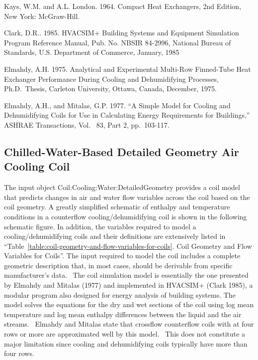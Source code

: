 Kays, W.M. and A.L. London. 1964. Compact Heat Exchangers, 2nd Edition, New York: McGraw-Hill.

Clark, D.R.. 1985. HVACSIM+ Building Systems and Equipment Simulation Program Reference Manual, Pub. No. NBSIR 84-2996, National Bureau of Standards, U.S. Department of Commerce, January, 1985

Elmahdy, A.H. 1975. Analytical and Experimental Multi-Row Finned-Tube Heat Exchanger Performance During Cooling and Dehumidifying Processes, Ph.D.~Thesis, Carleton University, Ottawa, Canada, December, 1975.

Elmahdy, A.H., and Mitalas, G.P. 1977. ``A Simple Model for Cooling and Dehumidifying Coils for Use in Calculating Energy Requirements for Buildings,'' ASHRAE Transactions, Vol.~ 83, Part 2, pp.~103-117.

\subsection{Chilled-Water-Based Detailed Geometry Air Cooling Coil}\label{chilled-water-based-detailed-geometry-air-cooling-coil}

The input object Coil:Cooling:Water:DetailedGeometry provides a coil model that predicts changes in air and water flow variables across the coil based on the coil geometry. A greatly simplified schematic of enthalpy and temperature conditions in a counterflow cooling/dehumidifying coil is shown in the following schematic figure. In addition, the variables required to model a cooling/dehumidifying coils and their definitions are extensively listed in ``Table~\ref{table:coil-geometry-and-flow-variables-for-coils}. Coil Geometry and Flow Variables for Coils''. The input required to model the coil includes a complete geometric description that, in most cases, should be derivable from specific manufacturer's data.~ The coil simulation model is essentially the one presented by Elmahdy and Mitalas (1977) and implemented in HVACSIM+ (Clark 1985), a modular program also designed for energy analysis of building systems. The model solves the equations for the dry and wet sections of the coil using log mean temperature and log mean enthalpy differences between the liquid and the air streams.~ Elmahdy and Mitalas state that crossflow counterflow coils with at four rows or more are approximated well by this model.~ This does not constitute a major limitation since cooling and dehumidifying coils typically have more than four rows.

